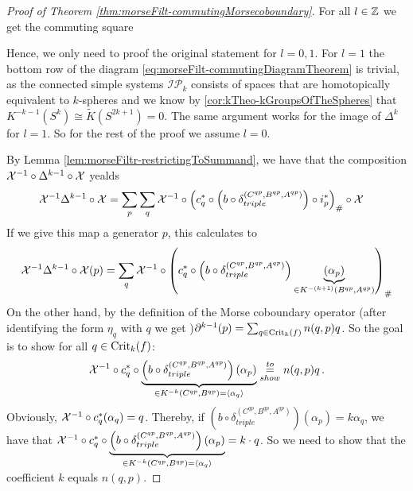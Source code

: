 \begin{proof}[Proof of Theorem \ref{thm:morseFilt-commutingMorsecoboundary}]
	For all $l\in \mathbb{Z}$ we get the commuting square 
	\begin{center}
	\end{center}
	Hence, we only need to proof the original statement for $l=0,1$.
	For $l=1$ the bottom row of the diagram \ref{eq:morseFilt-commutingDiagramTheorem} is trivial, as the connected simple systems $\mathcal{IP}_k$ consists of spaces that are homotopically equivalent to $k$-spheres and we know by \ref{cor:kTheo-kGroupsOfTheSpheres} that $K^{-k-1}(S^k)\cong\tilde{K}(S^{2k+1})=0$. The same argument works for the image of $\Delta^k$ for $l=1$. So for the rest of the proof we assume $l=0$. 
    
    By Lemma \ref{lem:morseFiltr-restrictingToSummand}, we have that the composition $ \mathcal{X}^{-1}\circ \Delta^{k-1} \circ \mathcal{X}$ yealds 
    \begin{align*}
        \mathcal{X}^{-1}\Delta^{k-1} \circ \mathcal{X}
        &=\sum_p \sum_q  \mathcal{X}^{-1}\circ { \left(c^*_q\circ \left(b\circ \delta_{triple}^{(C^{qp},B^{qp},A^{qp})}\right) \circ i^*_p\right)}_{\#}\circ \mathcal{X}
    \end{align*} If we give this map a generator $p$, this calculates to
	\begin{equation*}
		\mathcal{X}^{-1}\Delta^{k-1} \circ \mathcal{X} (p) 
        =\sum_q  \mathcal{X}^{-1}\circ { \left(c^*_q\circ \left(b\circ \delta_{triple}^{(C^{qp},B^{qp},A^{qp})}\right) \underbrace{(\alpha_p)}_{\in K^{-(k+1)}(B^{qp},A^{qp})}\right)}_{\#}
	\end{equation*}
	On the other hand, by the definition of the Morse coboundary operator (after identifying the form $\eta_q$ with $q$ we get )$\partial^{k-1}(p)=\sum_{q\in\mathrm{Crit}_k(f)}n(q,p)q$. So the goal is to show for all $q\in \mathrm{Crit}_k(f)$:
	\begin{equation*} 
		\Chi^{-1} \circ c^*_q\circ \underbrace{\left(b\circ \delta_{triple}^{(C^{qp},B^{qp},A^{qp})}\right)(\alpha_p)}_{\in K^{-k}(C^{qp},B^{qp})=\langle \alpha_q\rangle}\overunderset{to}{show}{=}n(q,p)q\,.
	\end{equation*}
	Obviously, $\mathcal{X}^{-1} \circ c^*_q(\alpha_q)=q$. Thereby, if $\left(b\circ \delta_{triple}^{(C^{qp},B^{qp},A^{qp})}\right)(\alpha_p)=k \alpha_q$, we have that $\mathcal{X}^{-1} \circ c^*_q\circ \underbrace{\left(b\circ \delta_{triple}^{(C^{qp},B^{qp},A^{qp})}\right)(\alpha_p)}_{\in K^{-k}(C^{qp},B^{qp})=\langle \alpha_q\rangle}=k\cdot q$. So we need to show that the coefficient $k$ equals $n(q,p)$.



\end{proof}
